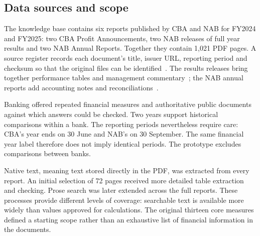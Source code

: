 \subsection{Data sources and scope}
\label{subsec:data_sources}

The knowledge base contains six reports published by CBA and NAB for FY2024 and FY2025: two CBA Profit Announcements, two NAB releases of full year results and two NAB Annual Reports. Together they contain 1,021 PDF pages. A source register records each document's title, issuer URL, reporting period and checksum so that the original files can be identified~\cite{fintraceSources2026}. The results releases bring together performance tables and management commentary~\cite{fintraceCBA2025,nabResults2025}; the NAB annual reports add accounting notes and reconciliations~\cite{nabAnnual2025}.

Banking offered repeated financial measures and authoritative public documents against which answers could be checked. Two years support historical comparisons within a bank. The reporting periods nevertheless require care: CBA's year ends on 30 June and NAB's on 30 September. The same financial year label therefore does not imply identical periods. The prototype excludes comparisons between banks.

Native text, meaning text stored directly in the PDF, was extracted from every report. An initial selection of 72 pages received more detailed table extraction and checking. Prose search was later extended across the full reports. These processes provide different levels of coverage: searchable text is available more widely than values approved for calculations. The original thirteen core measures defined a starting scope rather than an exhaustive list of financial information in the documents.
